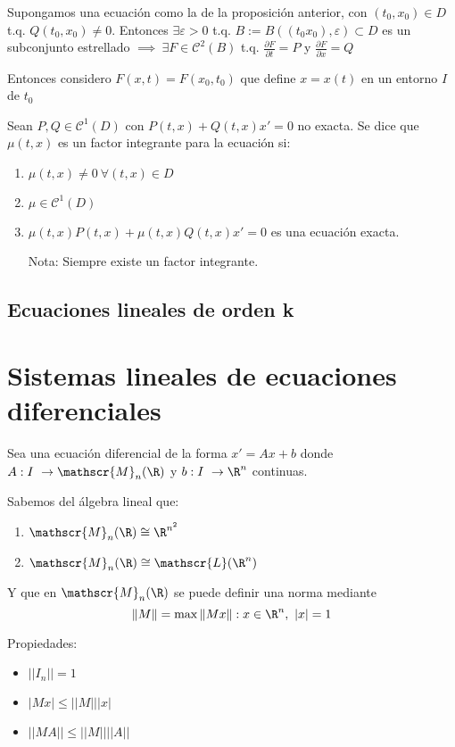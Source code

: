 Supongamos una ecuación como la de la proposición anterior, con $(t_0, x_0) \in D$ t.q. $Q(t_0, x_0) \neq 0$. Entonces $\exists \varepsilon > 0$ t.q. $B  := B( (t_0 x_0 ), \varepsilon) \subset D$ es un subconjunto estrellado $\implies \ \exists F \in \mathscr{C}^2 (B)$ t.q. $\frac{\partial F}{\partial t} = P$ y $\frac{\partial F}{\partial x} = Q$

Entonces considero  $F(x,t) = F(x_0, t_0)$ que define $x=x(t)$ en un entorno $I$ de $t_0$


\begin{ndef}
Sean $P,Q \in \mathscr{C}^1 (D)$ con $P(t,x) + Q(t,x) x' = 0$ no exacta. Se dice que $\mu (t,x)$ es un factor integrante para la ecuación si:
\begin{enumerate}
\item $\mu(t,x) \neq 0 \ \forall (t,x) \in D$
\item $\mu \in \mathscr{C}^1 (D)$
\item $\mu (t,x)P(t,x) + \mu (t,x)Q(t,x) x' = 0$ es una ecuación exacta.

Nota: Siempre existe un factor integrante.
\end{enumerate}

\end{ndef}

\subsection{Ecuaciones lineales de orden k}


\section{Sistemas lineales de ecuaciones diferenciales}

Sea una ecuación diferencial de la forma $x' = Ax+b$ donde $A: I \ \to \mathscr{M}_n (\R)$ y $b:I \ \to \R ^n$ continuas.

\begin{nota} Sabemos del álgebra lineal que:

  \begin{enumerate}
  \item $\mathscr{M}_n (\R) \cong \R ^{n^2}$
  \item $\mathscr{M}_n (\R) \cong \mathscr{L}(\R^n)$
  \end{enumerate}

  Y que en $\mathscr{M}_n(\R)$ se puede definir una norma mediante
  \[
  \|M\| = \max { \|Mx\| : x \in \R ^n , \ |x| = 1}
  \]

  Propiedades:

  \begin{itemize}
  \item $||I_n || = 1$
  \item $ |Mx| \leq ||M|| |x|$
  \item $ ||MA|| \leq ||M|| ||A||$
  \end{itemize}

\end{nota}

